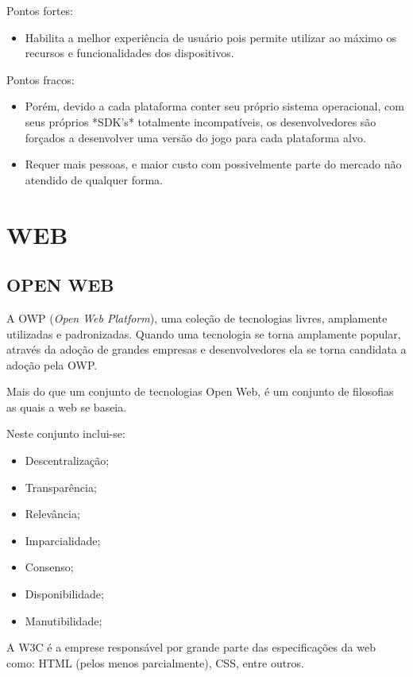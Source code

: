 \documentclass[
12pt,
a4paper,
portuges,
draft
]{report}
\begin{document}
Pontos fortes:
\begin{itemize}
\item Habilita a melhor experiência de usuário pois permite utilizar ao
máximo os recursos e funcionalidades dos dispositivos.
\end{itemize}

Pontos fracos:
\begin{itemize}
\item Porém, devido a cada plataforma conter seu próprio sistema operacional,
com seus próprios *SDK's* totalmente incompatíveis, os desenvolvedores são
forçados a desenvolver uma versão do jogo para cada plataforma alvo.
\item Requer mais pessoas, e maior custo com possivelmente parte do mercado não atendido de qualquer forma.
\end{itemize}

\section{WEB}

\subsection{OPEN WEB}

A OWP (\textit{Open Web Platform}), uma coleção de tecnologias livres,
amplamente utilizadas e padronizadas.
Quando uma tecnologia se torna amplamente popular, através da
adoção de grandes empresas e desenvolvedores ela se torna candidata a
adoção pela OWP.

Mais do que um conjunto de tecnologias Open Web, é um conjunto de
filosofias as quais a web se baseia.

Neste conjunto inclui-se:

\begin{itemize}
\item Descentralização;
\item Transparência;
\item Relevância;
\item Imparcialidade;
\item Consenso;
\item Disponibilidade;
\item Manutibilidade;
\end{itemize}


A W3C é a emprese responsável por grande parte das especificações da web como: HTML (pelos menos parcialmente), CSS, entre outros.
\end{document}
